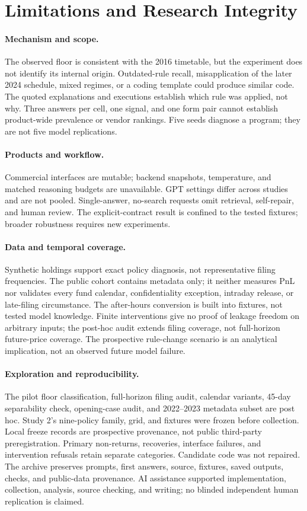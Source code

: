 \documentclass[10pt,twocolumn,a4paper]{article}
\begin{document}
\section{Limitations and Research Integrity}
\label{sec:limits}
\paragraph{Mechanism and scope.}
The observed floor is consistent with the 2016 timetable, but the experiment does not identify its internal origin. Outdated-rule recall, misapplication of the later 2024 schedule, mixed regimes, or a coding template could produce similar code. The quoted explanations and executions establish which rule was applied, not why. Three answers per cell, one signal, and one form pair cannot establish product-wide prevalence or vendor rankings. Five seeds diagnose a program; they are not five model replications.

\paragraph{Products and workflow.}
Commercial interfaces are mutable; backend snapshots, temperature, and matched reasoning budgets are unavailable. GPT settings differ across studies and are not pooled. Single-answer, no-search requests omit retrieval, self-repair, and human review. The explicit-contract result is confined to the tested fixtures; broader robustness requires new experiments.

\paragraph{Data and temporal coverage.}
Synthetic holdings support exact policy diagnosis, not representative filing frequencies. The public cohort contains metadata only; it neither measures PnL nor validates every fund calendar, confidentiality exception, intraday release, or late-filing circumstance. The after-hours conversion is built into fixtures, not tested model knowledge. Finite interventions give no proof of leakage freedom on arbitrary inputs; the post-hoc audit extends filing coverage, not full-horizon future-price coverage. The prospective rule-change scenario is an analytical implication, not an observed future model failure.

\paragraph{Exploration and reproducibility.}
The pilot floor classification, full-horizon filing audit, calendar variants, 45-day separability check, opening-case audit, and 2022--2023 metadata subset are post hoc. Study 2's nine-policy family, grid, and fixtures were frozen before collection. Local freeze records are prospective provenance, not public third-party preregistration. Primary non-returns, recoveries, interface failures, and intervention refusals retain separate categories. Candidate code was not repaired. The archive preserves prompts, first answers, source, fixtures, saved outputs, checks, and public-data provenance. AI assistance supported implementation, collection, analysis, source checking, and writing; no blinded independent human replication is claimed.
\end{document}
